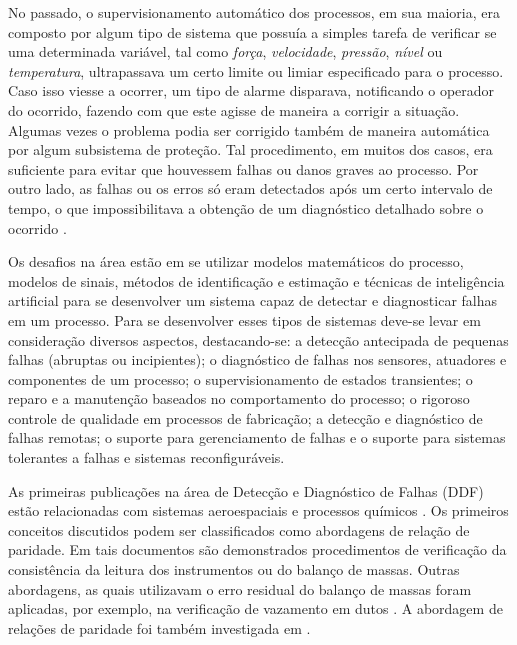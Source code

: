 No passado, o supervisionamento automático dos processos, em sua maioria, era
composto por algum tipo de sistema que possuía a simples tarefa de verificar se
uma determinada variável, tal como {\it força}, {\it velocidade}, {\it pressão},
{\it nível} ou {\it temperatura}, ultrapassava um certo limite ou limiar
especificado para o processo. Caso isso viesse a ocorrer, um tipo de alarme
disparava, notificando o operador do ocorrido, fazendo com que este agisse de
maneira a corrigir a situação. Algumas vezes o problema podia ser corrigido
também de maneira automática por algum subsistema de proteção. Tal procedimento,
em muitos dos casos, era suficiente para evitar que houvessem falhas ou danos
graves ao processo. Por outro lado, as falhas ou os erros só eram detectados
após um certo intervalo de tempo, o que impossibilitava a obtenção de um
diagnóstico detalhado sobre o ocorrido \cite{isermann:2006}.

Os desafios na área estão em se utilizar modelos matemáticos do processo,
modelos de sinais, métodos de identificação e estimação e técnicas de
inteligência artificial para se desenvolver um sistema capaz de detectar e
diagnosticar falhas em um processo. Para se desenvolver esses tipos de sistemas
deve-se levar em consideração diversos aspectos, destacando-se: a detecção
antecipada de pequenas falhas (abruptas ou incipientes); o diagnóstico de falhas
nos sensores, atuadores e componentes de um processo; o supervisionamento de
estados transientes; o reparo e a manutenção baseados no comportamento do
processo; o rigoroso controle de qualidade em processos de fabricação; a
detecção e diagnóstico de falhas remotas; o suporte para gerenciamento de falhas
e o suporte para sistemas tolerantes a falhas e sistemas reconfiguráveis.

As primeiras publicações na área de Detecção e Diagnóstico de Falhas (DDF) estão
relacionadas com sistemas aeroespaciais
\cite{beard:1971,jones:1973,willsky:1976,clark:1978} e processos químicos
\cite{himmelblau:1978}. Os primeiros conceitos discutidos podem ser
classificados como abordagens de relação de paridade. Em tais documentos são
demonstrados procedimentos de verificação da consistência da leitura dos
instrumentos ou do balanço de massas. Outras abordagens, as quais utilizavam o
erro residual do balanço de massas foram aplicadas, por exemplo, na verificação
de vazamento em dutos \cite{billman:1987}. A abordagem de relações de paridade
foi também investigada em .


